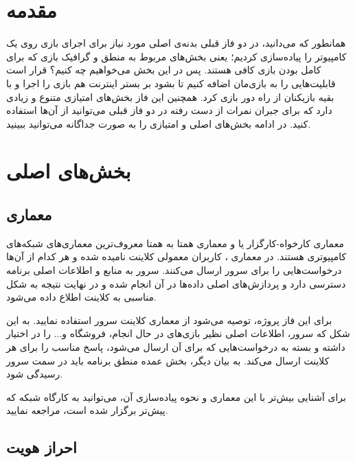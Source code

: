 \documentclass[]{article}
\begin{document}
\newpage

\section*{{\titr مقدمه}}

همانطور که می‌دانید، در دو فاز قبلی بدنه‌ی اصلی مورد نیاز برای اجرای بازی روی یک کامپیوتر را پیاده‌سازی کردیم؛ یعنی بخش‌های مربوط به منطق و گرافیک بازی که برای کامل بودن بازی کافی هستند. پس در این بخش می‌خواهیم چه کنیم؟ قرار است قابلیت‌هایی را به بازی‌مان اضافه کنیم تا بشود بر بستر اینترنت هم بازی را اجرا و با بقیه بازیکنان از راه دور بازی کرد. همچنین این فاز بخش‌های امتیازی متنوع و زیادی دارد که برای جبران نمرات از دست‌ رفته در دو فاز قبلی می‌توانید از آن‌ها استفاده کنید. در ادامه بخش‌های اصلی و امتیازی را به صورت جداگانه می‌توانید ببینید.

\section*{{\titr بخش‌های اصلی}}

\subsection*{{\titr معماری }}

معماری کارخواه-کارگزار یا  و معماری همتا به همتا  معروف‌ترین معماری‌های شبکه‌های کامپیوتری هستند. در معماری ، کاربران معمولی کلاینت نامیده شده و هر کدام از آن‌ها درخواست‌هایی را برای سرور ارسال می‌کنند. سرور به منابع و اطلاعات اصلی برنامه دسترسی دارد و پردازش‌های اصلی داده‌ها در آن انجام شده و در نهایت نتیجه به شکل مناسبی به کلاینت اطلاع داده می‌شود.

برای این فاز پروژه، توصیه می‌شود از معماری کلاینت سرور استفاده نمایید. به این شکل که سرور، اطلاعات اصلی نظیر بازی‌های در حال انجام، فروشگاه و... را در اختیار داشته و بسته به درخواست‌هایی که برای آن ارسال می‌شود، پاسخ مناسب را برای هر کلاینت ارسال می‌کند. به بیان دیگر، بخش عمده منطق برنامه باید در سمت سرور رسیدگی شود.

برای آشنایی بیش‌تر با این معماری و نحوه پیاده‌سازی آن، می‌توانید به کارگاه شبکه که پیش‌تر برگزار شده است، مراجعه نمایید.




\subsection*{{\titr احراز هویت}}
\end{document}
